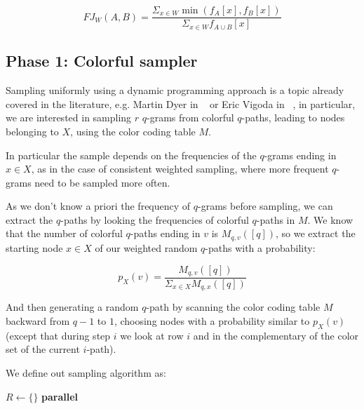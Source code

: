 \begin{equation}\label{fj-w}
	FJ_{W}(A,B) = \frac{ \Sigma_{x \in W} \min(f_{A}[x], f_{B}[x]) }{ \Sigma_{x \in W} f_{A \cup B}[x] }
\end{equation}

\subsection*{Phase 1: Colorful sampler}

Sampling uniformly using a dynamic programming approach is a topic already covered in the literature, e.g. Martin Dyer in ~\cite{Dyer:2003:ACD:780542.780643} or Eric Vigoda in ~\cite{Vigoda2010LectureNO}, in particular, we are interested in sampling $r$ $q$-grams from colorful $q$-paths, leading to nodes belonging to $X$, using the color coding table $M$.\bigskip

In particular the sample depends on the frequencies of the $q$-grams ending in $x \in X$, as in the case of consistent weighted sampling, where more frequent $q$-grams need to be sampled more often.
 
As we don't know a priori the frequency of $q$-grams before sampling, we can extract the $q$-paths by looking the frequencies of colorful $q$-paths in $M$. We know that the number of colorful $q$-paths ending in $v$ is $M_{q,v}([q])$, so we extract the starting node $x \in X$ of our weighted random $q$-paths with a probability:\bigskip

\begin{equation}
	p_{X}(v) = \frac{ M_{q,v}([q]) }{ \Sigma_{x \in X}{M_{q, x}([q])} }
\end{equation}

\bigskip

And then generating a random $q$-path by scanning the color coding table $M$ backward from $q-1$ to $1$, choosing nodes with a probability similar to $p_{X}(v)$ (except that during step $i$ we look at row $i$ and in the complementary of the color set of the current $i$-path).\bigskip

\clearpage

We define out sampling algorithm as:

\begin{algorithm}[h]
	\small
	\DontPrintSemicolon
	\BlankLine
	$R \gets \{\}$\;
	\BlankLine
	\textbf{parallel} 
	\BlankLine
	\BlankLine
	\caption{$\textsc{colorful-sampler}$}
	\label{alg:colorful-sampler}
\end{algorithm}

